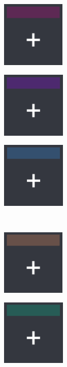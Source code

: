 \begin{figure}[h!] 
	\centering
	\begin{subfigure}{0.185\textwidth}
		\centering
		\includegraphics[scale=1, frame]{gui-imgs/player1disabledpanel}
	\end{subfigure}
	\begin{subfigure}{0.185\textwidth}
		\centering
		\includegraphics[scale=1, frame]{gui-imgs/player2disabledpanel}
	\end{subfigure}
	\begin{subfigure}{0.185\textwidth}
		\centering
		\includegraphics[scale=1, frame]{gui-imgs/player3disabledpanel}
	\end{subfigure} \\
	\begin{subfigure}{0.185\textwidth}
		\centering
		\includegraphics[scale=1, frame]{gui-imgs/player4disabledpanel}
	\end{subfigure}
	\begin{subfigure}{0.185\textwidth}
		\centering
		\includegraphics[scale=1, frame]{gui-imgs/player5disabledpanel}

\end{subfigure}
\end{figure}
